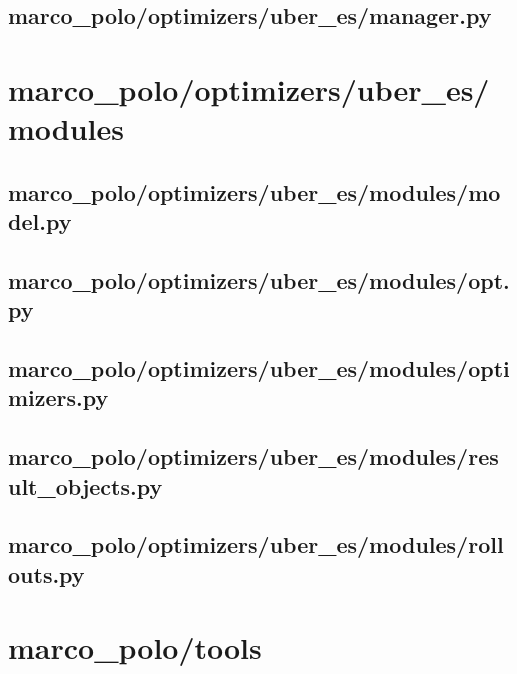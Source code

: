 \documentclass{article}
\begin{document}
\subsection[manager.py]{marco\_polo/optimizers/uber\_es/manager.py}

\newpage

\section{marco\_polo/optimizers/uber\_es/modules}
\subsection[model.py]{marco\_polo/optimizers/uber\_es/modules/model.py}

\newpage

\subsection[opt.py]{marco\_polo/optimizers/uber\_es/modules/opt.py}

\newpage

\subsection[optimizers.py]{marco\_polo/optimizers/uber\_es/modules/optimizers.py}

\newpage

\subsection[result\_objects.py]{marco\_polo/optimizers/uber\_es/modules/result\_objects.py}

\newpage

\subsection[rollouts.py]{marco\_polo/optimizers/uber\_es/modules/rollouts.py}

\newpage

\section{marco\_polo/tools}
\end{document}
